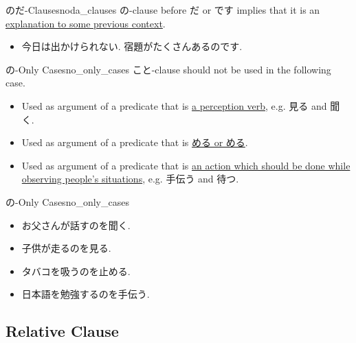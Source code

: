 \documentclass{article}
\begin{document}
\begin{counterexample}{のだ-Clauses}{noda_clauses}
    の-clause before だ or です implies that it is an \href{https://japanese.stackexchange.com/questions/5398/what-is-the-meaning-of-%EF%BD%9E%E3%82%93%E3%81%A7%E3%81%99-%EF%BD%9E%E3%81%AE%E3%81%A0-etc}{explanation to some previous context}.
    \begin{itemize}
        \item 今日は出かけられない. 宿題がたくさんある{\color{cyan}の}です.
    \end{itemize}
\end{counterexample}

\begin{proposition}{の-Only Cases}{no_only_cases}
    こと-clause should not be used in the following case.
    \begin{itemize}
        \item Used as argument of a predicate that is \href{https://www.wasabi-jpn.com/japanese-grammar/nominalizers-koto-and-no/}{a perception verb}, e.g. 見る and 聞く.
        \item Used as argument of a predicate that is \href{https://www.wasabi-jpn.com/japanese-grammar/nominalizers-koto-and-no/}{める or める}.
        \item Used as argument of a predicate that is \href{https://www.wasabi-jpn.com/japanese-grammar/nominalizers-koto-and-no/}{an action which should be done while observing people's situations}, e.g. 手伝う and 待つ.
    \end{itemize}
\end{proposition}

\begin{example}{の-Only Cases}{no_only_cases}
    \begin{itemize}
        \item お父さんが話す{\color{cyan}の}を聞く.
        \item 子供が走る{\color{cyan}の}を見る.
        \item タバコを吸う{\color{cyan}の}を止める.
        \item 日本語を勉強する{\color{cyan}の}を手伝う.
    \end{itemize}
\end{example}

\subsection{Relative Clause}
\end{document}
